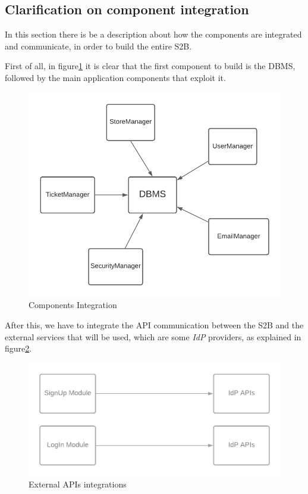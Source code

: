 \documentclass[table, 12pt]{article}
\begin{document}
\subsection{Clarification on component integration}
In this section there is be a description about how the components are integrated and communicate, in order to build the entire S2B.

First of all, in figure\ref{components_integration} it is clear that the first component to build is the DBMS, followed by the main application components that exploit it.

\begin{center}
    \begin{figure}[H]
        \includegraphics[width=\textwidth]{assets/IT-Plan/Components-Integration.png}
        \caption{Components Integration}\label{components_integration}
    \end{figure}
\end{center}


After this, we have to integrate the API communication between the S2B and the external services that will be used, which are some \textit{IdP} providers, as explained in figure\ref{external_services}.

\begin{center}
    \begin{figure}[H]
        \includegraphics[width=\textwidth]{assets/IT-Plan/External-Services.png}
        \caption{External APIs integrations}\label{external_services}
    \end{figure}
\end{center}
\end{document}
